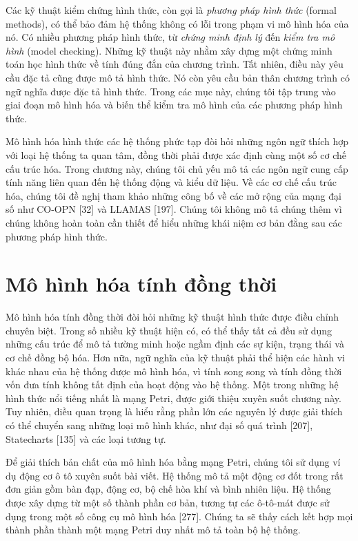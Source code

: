 Các kỹ thuật kiểm chứng hình thức, còn gọi là \emph{phương pháp hình thức} (formal methods), có thể bảo đảm hệ thống không có lỗi trong phạm vi mô hình hóa của nó. Có nhiều phương pháp hình thức, từ \emph{chứng minh định lý} đến \emph{kiểm tra mô hình} (model checking). Những kỹ thuật này nhằm xây dựng một chứng minh toán học hình thức về tính đúng đắn của chương trình. Tất nhiên, điều này yêu cầu đặc tả cũng được mô tả hình thức. Nó còn yêu cầu bản thân chương trình có ngữ nghĩa được đặc tả hình thức. Trong các mục này, chúng tôi tập trung vào giai đoạn mô hình hóa và biến thể kiểm tra mô hình của các phương pháp hình thức.

Mô hình hóa hình thức các hệ thống phức tạp đòi hỏi những ngôn ngữ thích hợp với loại hệ thống ta quan tâm, đồng thời phải được xác định cùng một số cơ chế cấu trúc hóa. Trong chương này, chúng tôi chủ yếu mô tả các ngôn ngữ cung cấp tính năng liên quan đến hệ thống động và kiểu dữ liệu. Về các cơ chế cấu trúc hóa, chúng tôi đề nghị tham khảo những công bố về các mở rộng của mạng đại số như CO-OPN [32] và LLAMAS [197]. Chúng tôi không mô tả chúng thêm vì chúng không hoàn toàn cần thiết để hiểu những khái niệm cơ bản đằng sau các phương pháp hình thức.

\section{Mô hình hóa tính đồng thời}
Mô hình hóa tính đồng thời đòi hỏi những kỹ thuật hình thức được điều chỉnh chuyên biệt. Trong số nhiều kỹ thuật hiện có, có thể thấy tất cả đều sử dụng những cấu trúc để mô tả tường minh hoặc ngầm định các sự kiện, trạng thái và cơ chế đồng bộ hóa. Hơn nữa, ngữ nghĩa của kỹ thuật phải thể hiện các hành vi khác nhau của hệ thống được mô hình hóa, vì tính song song và tính đồng thời vốn đưa tính không tất định của hoạt động vào hệ thống. Một trong những hệ hình thức nổi tiếng nhất là mạng Petri, được giới thiệu xuyên suốt chương này. Tuy nhiên, điều quan trọng là hiểu rằng phần lớn các nguyên lý được giải thích có thể chuyển sang những loại mô hình khác, như đại số quá trình [207], Statecharts [135] và các loại tương tự.

Để giải thích bản chất của mô hình hóa bằng mạng Petri, chúng tôi sử dụng ví dụ động cơ ô tô xuyên suốt bài viết. Hệ thống mô tả một động cơ đốt trong rất đơn giản gồm bàn đạp, động cơ, bộ chế hòa khí và bình nhiên liệu. Hệ thống được xây dựng từ một số thành phần cơ bản, tương tự các ô-tô-mát được sử dụng trong một số công cụ mô hình hóa [277]. Chúng ta sẽ thấy cách kết hợp mọi thành phần thành một mạng Petri duy nhất mô tả toàn bộ hệ thống.

